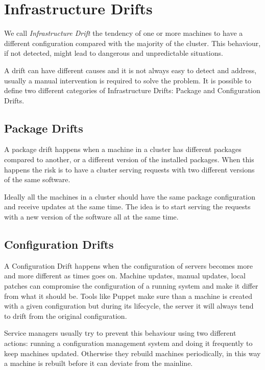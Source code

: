 \section{Infrastructure Drifts}

We call \textit{Infrastructure Drift} the tendency of one or more machines
to have a different configuration compared with the majority of the
cluster. This behaviour, if not detected, might lead to dangerous and
unpredictable situations.

A drift can have different causes and it is not always easy to detect and
address, usually a manual intervention is required to solve the problem.
It is possible to define two different categories of Infrastructure
Drifts: Package and Configuration Drifts.

\subsection{Package Drifts}

A package drift happens when a machine in a cluster has different packages
compared to another, or a different version of the installed packages.
When this happens the risk is to have a cluster serving requests with two
different versions of the same software.

Ideally all the machines in a cluster should have the same package
configuration and receive updates at the same time. The idea is to start
serving the requests with a new version of the software all at the same
time. 

\subsection{Configuration Drifts}

A Configuration Drift happens when the configuration of servers becomes
more and more different as times goes on. Machine updates, manual updates,
local patches can compromise the configuration of a running system and
make it differ from what it should be. Tools like Puppet make sure than
a machine is created with a given configuration but during its lifecycle,
the server it will always tend to drift from the original configuration.

Service managers usually try to prevent this behaviour using two different
actions: running a configuration management system and doing it frequently
to keep machines updated. Otherwise they rebuild machines periodically, in
this way a machine is rebuilt before it can deviate from the mainline.
